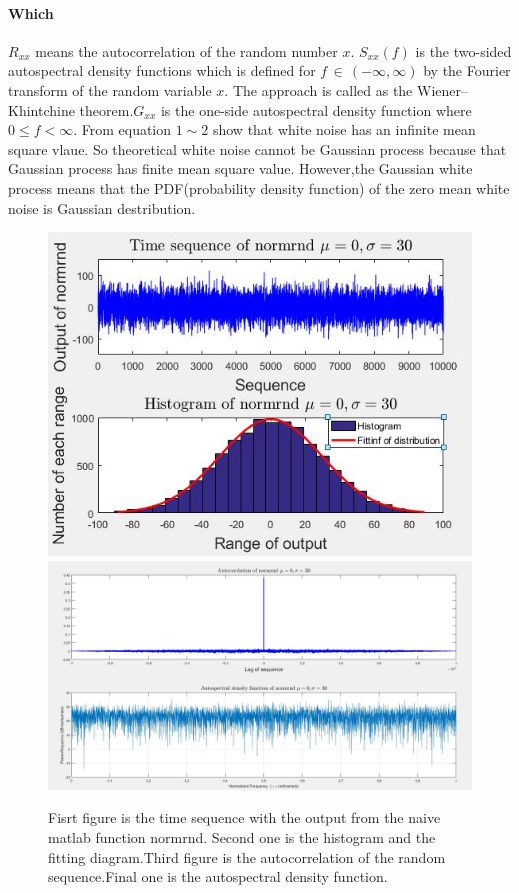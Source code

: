 \documentclass[12pt,a4paper]{article}
\begin{document}
	\paragraph{Which}$R_{xx}$ means the autocorrelation of the random number $x$. $S_{xx}(f)$ is the two-sided autospectral density functions which is defined for $f\,\in\,(-\infty,\infty)$ by the Fourier transform of the random variable $x$. The approach is called as the Wiener–Khintchine theorem\cite{Net1}.$G_{xx}$ is the one-side autospectral density function where $0 \leq f < \infty$. From equation $1\sim 2$ show that white noise has an infinite mean square vlaue. So theoretical white noise cannot be Gaussian process because that Gaussian process has finite mean square value. However,the Gaussian white process means that the PDF(probability density function) of the zero mean white noise is Gaussian destribution.
	\begin{figure}[H]
		\begin{center}
			\includegraphics[scale=0.5]{Problem1a}
			\includegraphics[scale=0.4]{Problem1a2}
		\end{center}
		\caption[Properties of the Gaussian white process generated by the naive matlab function]{Fisrt figure is the time sequence with the output from the naive matlab function normrnd. Second one is the histogram and the fitting diagram.Third figure is the autocorrelation of the random sequence.Final one is the autospectral density function.}
	\end{figure}
\end{document}
